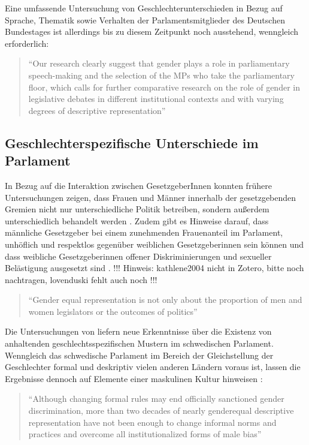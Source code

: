 \documentclass[12pt, 
    twoside=false, 
    bibliography=totoc, 
    numbers=endperiod, 
    headings=normal, 
    toc=chapterentrydotfill
    ]{scrbook}
\begin{document}
Eine umfassende Untersuchung von Geschlechterunterschieden in Bezug auf Sprache, Thematik sowie Verhalten der Parlamentsmitglieder des Deutschen Bundestages ist allerdings bis zu diesem Zeitpunkt noch ausstehend, wenngleich erforderlich: 

\citereset
\begin{quote}
 \enquote{Our research clearly suggest that gender plays a role in parliamentary speech-making and the selection of the MPs who take the parliamentary floor, which calls for further comparative research on the role of gender in legislative  debates in different institutional contexts and with varying degrees of descriptive representation}
  \parencite[515]{back_2014}
\end{quote}


\subsection{Geschlechterspezifische Unterschiede im Parlament}



In Bezug auf die Interaktion zwischen GesetzgeberInnen konnten frühere Untersuchungen zeigen, dass Frauen und Männer innerhalb der gesetzgebenden Gremien nicht nur unterschiedliche Politik betreiben, sondern außerdem unterschiedlich behandelt werden \parencites[201]{erikson_2018}{childs_2004}. Zudem gibt es Hinweise darauf, dass männliche Gesetzgeber bei einem zunehmenden Frauenanteil im Parlament, unhöflich und respektlos gegenüber weiblichen Gesetzgeberinnen sein können \parencites[201]{erikson_2018}{kathlene_1994}{kathlene_2004} und dass weibliche Gesetzgeberinnen offener Diskriminierungen und sexueller Belästigung ausgesetzt sind \parencites[201]{erikson_2018}[76]{lovenduski_2005}{lovenduski_2004}. !!! Hinweis: kathlene2004 nicht in Zotero, bitte noch nachtragen, lovenduski fehlt auch noch !!!

 \begin{quote}
 \enquote{Gender equal representation is not only about the proportion of men and women legislators or the outcomes of politics}\parencite[197]{erikson_2018}
 \end{quote}
 
Die Untersuchungen von \textcite{erikson_2018} liefern neue Erkenntnisse über die Existenz von anhaltenden geschlechtsspezifischen Mustern im schwedischen Parlament. Wenngleich das schwedische Parlament im Bereich der Gleichstellung der Geschlechter formal und deskriptiv vielen anderen Ländern voraus ist, lassen die Ergebnisse dennoch auf Elemente einer maskulinen Kultur hinweisen \parencite[211]{erikson_2018}:
\begin{quote}
\enquote{Although changing formal rules
may end officially sanctioned gender discrimination, more than two decades of nearly genderequal
descriptive representation have not been enough to change informal norms and practices and
overcome all institutionalized forms of male bias} \parencite[211]{erikson_2018}
\end{quote}
\end{document}
